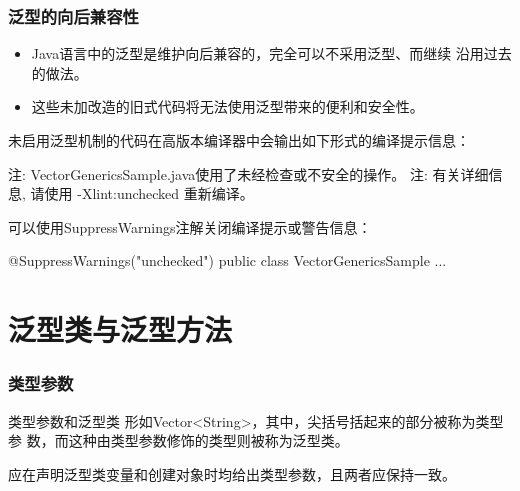\begin{frame}[fragile] %
  \frametitle{泛型的向后兼容性}

  \begin{block}{}
    \begin{itemize}
    \item Java语言中的泛型是维护向后兼容的，完全可以不采用泛型、而继续
      沿用过去的做法。
    \item 这些未加改造的旧式代码将无法使用泛型带来的便利和安全性。
    \end{itemize}
  \end{block}


  
  未启用泛型机制的代码在高版本编译器中会输出如下形式的编译提示信息：
  
  \begin{stdoutCode}
    注: VectorGenericsSample.java使用了未经检查或不安全的操作。
    注: 有关详细信息, 请使用 -Xlint:unchecked 重新编译。
  \end{stdoutCode}

  \pause
  
  可以使用SuppressWarnings注解关闭编译提示或警告信息：
  
  \begin{javaCode}
    @SuppressWarnings({"unchecked"})  
    public class VectorGenericsSample {
      ...
    }
  \end{javaCode}
\end{frame}




\section{泛型类与泛型方法}

\begin{frame}[fragile] %
  \frametitle{类型参数}

  \begin{alertblock}{类型参数和泛型类}
    形如Vector<String>，其中，尖括号括起来的部分被称为{\Red\hei 类型参
      数}，而这种由类型参数修饰的类型则被称为{\Blue\hei 泛型类}。
  \end{alertblock}


  应在声明泛型类变量和创建对象时均给出类型参数，且两者应保持一致。
\end{frame}

